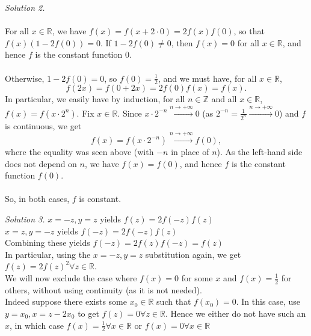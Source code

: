 \begin{solution}
\begin{remark}
    \end{remark}
    \noindent\textit{Solution 2.}
    \\\\
    For all \( x \in \mathbb{R} \), we have \( f\left(x\right) = f\left(x+2 \cdot 0\right) = 2f\left(x\right)f\left(0\right) \), so that \( f\left(x\right)\left(1-2f\left(0\right)\right) = 0 \). If \( 1-2f\left(0\right) \neq 0 \), then \( f\left(x\right) = 0 \) for all \( x \in \mathbb{R} \), and hence \( f \) is the constant function \( 0 \).
    \\\\
    Otherwise, \( 1-2f\left(0\right) = 0 \), so \( f\left(0\right) = \frac{1}{2} \), and we must have, for all \( x \in \mathbb{R} \),
    \[
        f\left(2x\right) = f\left(0+2x\right) = 2f\left(0\right)f\left(x\right) = f\left(x\right).
    \]
    In particular, we easily have by induction, for all \( n \in \mathbb{Z} \) and all \( x \in \mathbb{R} \), \( f\left(x\right) = f\left(x \cdot 2^n\right) \). Fix \( x \in \mathbb{R} \). Since \( x \cdot 2^{-n} \overset{n \to +\infty}{\longrightarrow} 0 \) (as \( 2^{-n} = \frac{1}{2^n} \overset{n \to +\infty}{\longrightarrow} 0 \)) and \( f \) is continuous, we get
    \[
        f\left(x\right) = f\left(x \cdot 2^{-n}\right) \overset{n \to +\infty}{\longrightarrow} f\left(0\right),
    \]
    where the equality was seen above (with \( -n \) in place of \( n \)). As the left-hand side does not depend on \( n \), we have \( f\left(x\right) = f\left(0\right) \), and hence \( f \) is the constant function \( f\left(0\right) \).
    \\\\
    So, in both cases, \( f \) is constant.

    \textit{Solution 3.}
    \( x=-z, y=z \) yields \( f(z)=2f(-z)f(z) \) \\
    \( x=z, y=-z \) yields \( f(-z) = 2f(-z)f(z) \) \\
    Combining these yields \( f(-z)=2f(z)f(-z)=f(z) \) \\
    In particular, using the \( x=-z, y=z \) substitution again, we get \( f(z)=2f(z)^2 \forall z \in \mathbb{R} \). \\
    We will now exclude the case where \( f(x)=0 \) for some \( x \) and \( f(x)=\frac{1}{2} \) for others, without using continuity (as it is not needed). \\
    Indeed suppose there exists some \( x_0 \in \mathbb{R} \) such that \( f(x_0)=0 \). In this case, use \( y=x_0, x=z-2x_0 \) to get \( f(z)=0 \forall z \in \mathbb{R} \). Hence we either do not have such an \( x \), in which case \( f(x)=\frac{1}{2} \forall x \in \mathbb{R} \) or \( f(x)=0 \forall x \in \mathbb{R} \)

\end{solution}
